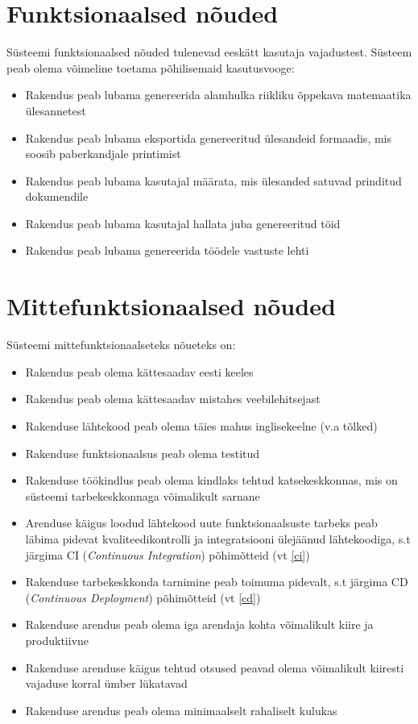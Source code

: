 \section{Funktsionaalsed nõuded}

Süsteemi funktsionaalsed nõuded tulenevad eeskätt kasutaja vajadustest. Süsteem peab olema võimeline toetama põhilisemaid kasutusvooge:

\begin{itemize}
  \item Rakendus peab lubama genereerida alamhulka riikliku õppekava matemaatika ülesannetest
  \item Rakendus peab lubama eksportida genereeritud ülesandeid formaadis, mis soosib paberkandjale printimist
  \item Rakendus peab lubama kasutajal määrata, mis ülesanded satuvad prinditud dokumendile
  \item Rakendus peab lubama kasutajal hallata juba genereeritud töid
  \item Rakendus peab lubama genereerida töödele vastuste lehti
\end{itemize}

\section{Mittefunktsionaalsed nõuded}

Süsteemi mittefunktsionaalseteks nõueteks on:

\begin{itemize}
  \item Rakendus peab olema kättesaadav eesti keeles
  \item Rakendus peab olema kättesaadav mistahes veebilehitsejast
  \item Rakenduse lähtekood peab olema täies mahus inglisekeelne (v.a tõlked)
  \item Rakenduse funktsionaalsus peab olema testitud
  \item Rakenduse töökindlus peab olema kindlaks tehtud katsekeskkonnas, mis on süsteemi tarbekeskkonnaga võimalikult sarnane
  \item Arenduse käigus loodud lähtekood uute funktsionaalsuste tarbeks peab läbima pidevat kvaliteedikontrolli ja integratsiooni ülejäänud lähtekoodiga, s.t järgima CI (\textit{Continuous Integration}) põhimõtteid (vt \ref{ci})
  \item Rakenduse tarbekeskkonda tarnimine peab toimuma pidevalt, s.t järgima CD (\textit{Continuous Deployment}) põhimõtteid (vt \ref{cd})
  \item Rakenduse arendus peab olema iga arendaja kohta võimalikult kiire ja produktiivne
  \item Rakenduse arenduse käigus tehtud otsused peavad olema võimalikult kiiresti vajaduse korral ümber lükatavad
  \item Rakenduse arendus peab olema minimaalselt rahaliselt kulukas
\end{itemize}

